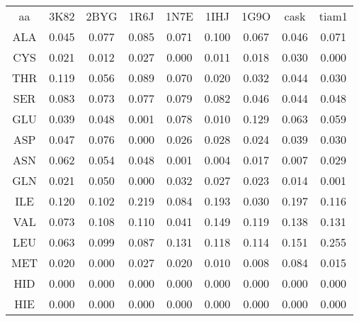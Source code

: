     \begin{table}[!htbp]
      \centering

      \begin{tabular}{ccccccccc}

        \toprule
        aa & 3K82 & 2BYG & 1R6J & 1N7E & 1IHJ & 1G9O & cask & tiam1 \\
        \cmidrule{1-9}
     ALA  & 0.045  &     0.077   &    0.085   &    0.071   &    0.100   &    0.067   &    0.046  &     0.071  \\
     CYS  & 0.021  &     0.012   &    0.027   &    0.000   &    0.011   &    0.018   &    0.030  &     0.000  \\
     THR  & 0.119  &     0.056   &    0.089   &    0.070   &    0.020   &    0.032   &    0.044  &     0.030  \\
        \cmidrule{1-9}
     SER  & 0.083  &     0.073   &    0.077   &    0.079   &    0.082   &    0.046   &    0.044  &     0.048  \\
        \cmidrule{1-9}
     GLU  & 0.039  &     0.048   &    0.001   &    0.078   &    0.010   &    0.129   &    0.063  &     0.059  \\
     ASP  & 0.047  &     0.076   &    0.000   &    0.026   &    0.028   &    0.024   &    0.039  &     0.030  \\
        \cmidrule{1-9}
     ASN  & 0.062  &     0.054   &    0.048   &    0.001   &    0.004   &    0.017   &    0.007  &     0.029  \\
     GLN  & 0.021  &     0.050   &    0.000   &    0.032   &    0.027   &    0.023   &    0.014  &     0.001  \\
        \cmidrule{1-9}
     ILE  & 0.120  &     0.102   &    0.219   &    0.084   &    0.193   &    0.030   &    0.197  &     0.116  \\
     VAL  & 0.073  &     0.108   &    0.110   &    0.041   &    0.149   &    0.119   &    0.138  &     0.131  \\
     LEU  & 0.063  &     0.099   &    0.087   &    0.131   &    0.118   &    0.114   &    0.151  &     0.255  \\
        \cmidrule{1-9}
     MET  & 0.020  &     0.000   &    0.027   &    0.020   &    0.010   &    0.008   &    0.084  &     0.015  \\
        \cmidrule{1-9}
     HID  & 0.000  &     0.000   &    0.000   &    0.000   &    0.000   &    0.000   &    0.000  &     0.000  \\
     HIE  & 0.000  &     0.000   &    0.000   &    0.000   &    0.000   &    0.000   &    0.000  &     0.000  \\

\end{tabular}
\end{table}
